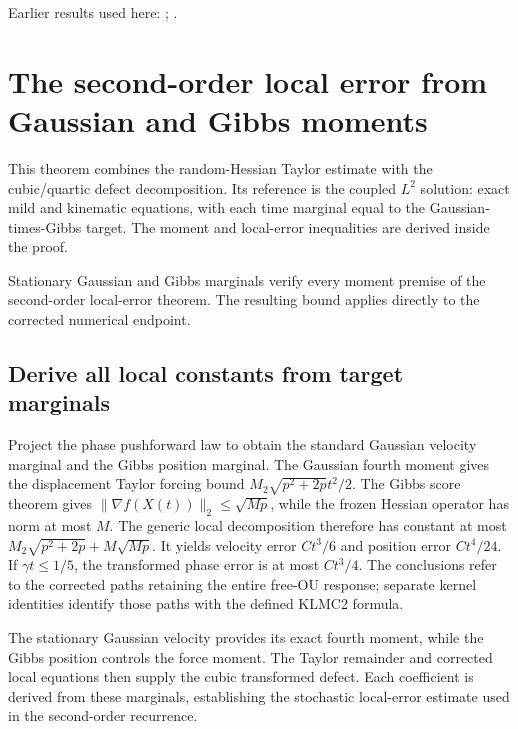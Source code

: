 \documentclass[11pt,a4paper]{report}
\begin{document}
Earlier results used here: \cite[Section~3.13.2]{LangevinLean2026ULASC}; \cite[Section~3.8.17]{LangevinLean2026ULASC}.
\section{\texorpdfstring{The second-order local error from Gaussian and Gibbs moments}{The second-order local error from Gaussian and Gibbs moments}}
\label{proof-module-KineticLangevin-SecondOrderLpLocal-lean}


This theorem combines the random-Hessian Taylor estimate with the cubic/\allowbreak{}quartic defect decomposition. Its reference is the coupled \(L^{2}\) solution: exact mild and kinematic equations, with each time marginal equal to the Gaussian-times-Gibbs target. The moment and local-error inequalities are derived inside the proof.



Stationary Gaussian and Gibbs marginals verify every moment premise of the second-order local-error theorem. The resulting bound applies directly to the corrected numerical endpoint.

\subsection{\texorpdfstring{Derive all local constants from target marginals}{Derive all local constants from target marginals}}
\label{report-step-KineticLangevin-SecondOrderLpLocal-lean-1}


Project the phase pushforward law to obtain the standard Gaussian velocity marginal and the Gibbs position marginal. The Gaussian fourth moment gives the displacement Taylor forcing bound \(M_{2}\sqrt{p^{2}+2p}t^{2}/2\). The Gibbs score theorem gives \(\|\nabla f(X(t))\|_{2}\le \sqrt{Mp}\), while the frozen Hessian operator has norm at most \(M\). The generic local decomposition therefore has constant at most \(M_{2}\sqrt{p^{2}+2p}+M\sqrt{Mp}\). It yields velocity error \(Ct^{3}/6\) and position error \(Ct^{4}/24\). If \(\gamma t\le 1/5\), the transformed phase error is at most \(Ct^{3}/4\). The conclusions refer to the corrected paths retaining the entire free-OU response; separate kernel identities identify those paths with the defined KLMC2 formula.



The stationary Gaussian velocity provides its exact fourth moment, while the Gibbs position controls the force moment. The Taylor remainder and corrected local equations then supply the cubic transformed defect. Each coefficient is derived from these marginals, establishing the stochastic local-error estimate used in the second-order recurrence.
\end{document}
